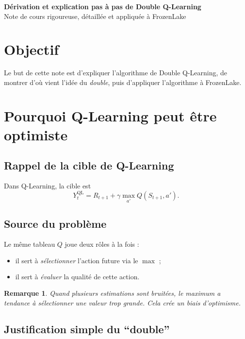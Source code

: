 \documentclass[11pt,a4paper]{article}
\newtheorem*{remarque}{Remarque}
\begin{document}
\begin{center}
    {\LARGE\bfseries Dérivation et explication pas à pas de Double Q-Learning}\\[0.4em]
    {\large Note de cours rigoureuse, détaillée et appliquée à FrozenLake}
\end{center}

\vspace{0.6em}

\section{Objectif}

Le but de cette note est d'expliquer l'algorithme de Double Q-Learning, de montrer d'où vient l'idée du \emph{double}, puis d'appliquer l'algorithme à FrozenLake.

\section{Pourquoi Q-Learning peut être optimiste}

\subsection{Rappel de la cible de Q-Learning}

Dans Q-Learning, la cible est
\[
Y_t^{\text{QL}} = R_{t+1}+\gamma \max_{a'} Q(S_{t+1},a').
\]

\subsection{Source du problème}

Le même tableau $Q$ joue deux rôles à la fois :
\begin{itemize}[leftmargin=1.6em]
    \item il sert à \emph{sélectionner} l'action future via le $\max$ ;
    \item il sert à \emph{évaluer} la qualité de cette action.
\end{itemize}

\begin{remarque}
Quand plusieurs estimations sont bruitées, le maximum a tendance à sélectionner une valeur trop grande. Cela crée un biais d'optimisme.
\end{remarque}

\subsection{Justification simple du ``double''}
\end{document}

